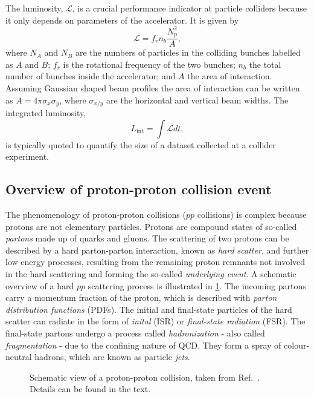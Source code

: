 The luminosity, $\mathcal{L}$, is a crucial performance indicator at particle colliders because it only depends on parameters of the accelerator.
It is given by
\begin{equation}
  \mathcal{L} = f_rn_b\frac{N_p^2}{A},
\end{equation}
where $N_A$ and $N_B$ are the numbers of particles in the colliding bunches labelled as $A$ and $B$; $f_r$ is the rotational frequency of the two bunches; $n_b$ the total number of bunches inside the accelerator; and $A$ the area of interaction. Assuming Gaussian shaped beam profiles the area of interaction can be written as $A = 4\pi \sigma_x \sigma_y$, where $\sigma_{x/y}$ are the horizontal and vertical beam widths.
The integrated luminosity, 
\begin{equation}
  L_\text{int} = \int \mathcal{L} dt,
\end{equation}
is typically quoted to quantify the size of a dataset collected at a collider experiment.

\subsection{Overview of proton-proton collision event}
\label{subsec:pp-collision-overview}
The phenomenology of proton-proton collisions ($pp$ collisions) is complex because protons are not elementary particles. Protons are compound states of so-called \emph{partons} made up of quarks and gluons.
The scattering of two protons can be described by a hard parton-parton interaction, known as \emph{hard scatter}, and further low energy processes, resulting from the remaining proton remnants not involved in the hard scattering and forming the so-called \emph{underlying event}.
A schematic overview of a hard $pp$ scattering process is illustrated in \cref{fig:ppcol}.
The incoming partons carry a momentum fraction of the proton, which is described with \emph{parton distribution functions} (PDFs).
The initial and final-state particles of the hard scatter can radiate in the form of \emph{inital} (ISR) or \emph{final-state radiation} (FSR). The final-state partons undergo a process called \emph{hadronization} - also called \emph{fragmentation} - due to the confining nature of QCD. They form a spray of colour-neutral hadrons, which are known as particle \emph{jets}.

\begin{figure}
  \caption[Schematic view of a proton-proton collision.]{Schematic view of a proton-proton collision, taken from Ref.~\cite{Bhatti:2010bf}. Details can be found in the text.}
  \label{fig:ppcol}
\end{figure}

